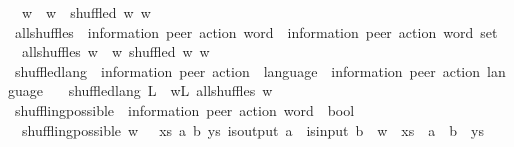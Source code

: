 \begin{isabellebody}
\ \ {\isachardoublequoteopen}w{\isacharprime}{\kern0pt}\ {\isasymsqunion}{\isasymsqunion}\isactrlsub {\isacharquery}{\kern0pt}\ w\ {\isasymequiv}\ shuffled\ w\ w{\isacharprime}{\kern0pt}{\isachardoublequoteclose}\isanewline
\isanewline
\isanewline
{}\isamarkupfalse%
\ all{\isacharunderscore}{\kern0pt}shuffles\ {\isacharcolon}{\kern0pt}{\isacharcolon}{\kern0pt}\ {\isachardoublequoteopen}{\isacharparenleft}{\kern0pt}{\isacharprime}{\kern0pt}information{\isacharcomma}{\kern0pt}\ {\isacharprime}{\kern0pt}peer{\isacharparenright}{\kern0pt}\ action\ word\ {\isasymRightarrow}\ {\isacharparenleft}{\kern0pt}{\isacharprime}{\kern0pt}information{\isacharcomma}{\kern0pt}\ {\isacharprime}{\kern0pt}peer{\isacharparenright}{\kern0pt}\ action\ word\ set{\isachardoublequoteclose}\ \isanewline
\ \ {\isachardoublequoteopen}all{\isacharunderscore}{\kern0pt}shuffles\ w\ {\isacharequal}{\kern0pt}\ {\isacharbraceleft}{\kern0pt}w{\isacharprime}{\kern0pt}{\isachardot}{\kern0pt}\ shuffled\ w\ w{\isacharprime}{\kern0pt}{\isacharbraceright}{\kern0pt}{\isachardoublequoteclose}\isanewline
\isanewline
\isanewline
{}\isamarkupfalse%
\ shuffled{\isacharunderscore}{\kern0pt}lang\ {\isacharcolon}{\kern0pt}{\isacharcolon}{\kern0pt}\ {\isachardoublequoteopen}{\isacharparenleft}{\kern0pt}{\isacharprime}{\kern0pt}information{\isacharcomma}{\kern0pt}\ {\isacharprime}{\kern0pt}peer{\isacharparenright}{\kern0pt}\ action\ \ language\ {\isasymRightarrow}\ {\isacharparenleft}{\kern0pt}{\isacharprime}{\kern0pt}information{\isacharcomma}{\kern0pt}\ {\isacharprime}{\kern0pt}peer{\isacharparenright}{\kern0pt}\ action\ language{\isachardoublequoteclose}\ \isanewline
\ \ {\isachardoublequoteopen}shuffled{\isacharunderscore}{\kern0pt}lang\ L\ {\isacharequal}{\kern0pt}\ {\isacharparenleft}{\kern0pt}{\isasymUnion}w{\isasymin}L{\isachardot}{\kern0pt}\ all{\isacharunderscore}{\kern0pt}shuffles\ w{\isacharparenright}{\kern0pt}{\isachardoublequoteclose}\isanewline
\isanewline
{}\isamarkupfalse%
\ shuffling{\isacharunderscore}{\kern0pt}possible\ {\isacharcolon}{\kern0pt}{\isacharcolon}{\kern0pt}\ {\isachardoublequoteopen}{\isacharparenleft}{\kern0pt}{\isacharprime}{\kern0pt}information{\isacharcomma}{\kern0pt}\ {\isacharprime}{\kern0pt}peer{\isacharparenright}{\kern0pt}\ action\ word\ {\isasymRightarrow}\ bool{\isachardoublequoteclose}\ \isanewline
\ \ {\isachardoublequoteopen}shuffling{\isacharunderscore}{\kern0pt}possible\ w\ {\isasymequiv}\ {\isacharparenleft}{\kern0pt}{\isasymexists}\ xs\ a\ b\ ys{\isachardot}{\kern0pt}\ is{\isacharunderscore}{\kern0pt}output\ a\ {\isasymand}\ is{\isacharunderscore}{\kern0pt}input\ b\ {\isasymand}\ w\ {\isacharequal}{\kern0pt}\ {\isacharparenleft}{\kern0pt}xs\ {\isacharat}{\kern0pt}\ a\ {\isacharhash}{\kern0pt}\ b\ {\isacharhash}{\kern0pt}\ ys{\isacharparenright}{\kern0pt}{\isacharparenright}{\kern0pt}{\isachardoublequoteclose}\isanewline

\end{isabellebody}
